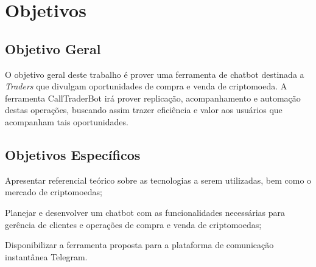 
\section{Objetivos}
\subsection{Objetivo Geral}
O objetivo geral deste trabalho é prover uma ferramenta de chatbot destinada a \emph{Traders} que divulgam oportunidades de compra e venda de criptomoeda. A ferramenta CallTraderBot irá prover replicação, acompanhamento e automação destas operações, buscando assim trazer  eficiência e valor aos usuários que acompanham tais oportunidades.

\subsection{Objetivos Específicos}
\begin{lista}
  \item Apresentar referencial teórico sobre as tecnologias a serem utilizadas, bem como o mercado de criptomoedas;
  \item Planejar e desenvolver um chatbot com as funcionalidades necessárias para gerência de clientes e operações de compra e venda de criptomoedas;
  \item Disponibilizar a ferramenta proposta para a plataforma de comunicação instantânea Telegram.
\end{lista}